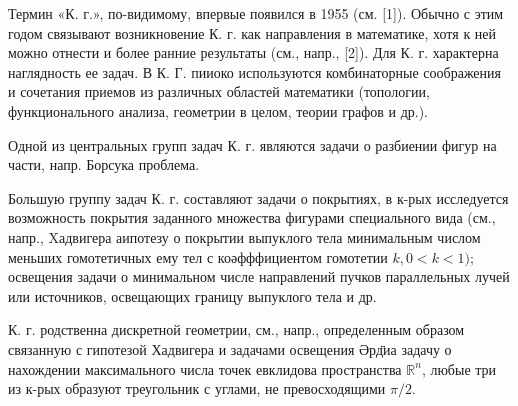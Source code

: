 \documentclass[10pt]{article}
\begin{document}
Термин «К. г.», по-видимому, впервые появился в 1955 (см. [1]). Обычно с этим годом связывают возникновение К. г. как направления в математике, хотя к ней можно отнести и более ранние результаты (см., напр., [2]). Для К. г. характерна наглядность ее задач. В К. Г. пииоко используются комбинаторные соображения и сочетания приемов из различных областей математики (топологии, функционального анализа, геометрии в целом, теории графов и др.).



Одной из центральных групп задач К. г. являются задачи о разбиении фигур на части, напр. Борсука проблема.



Большую группу задач К. г. составляют задачи о покрытиях, в к-рых исследуется возможность покрытия заданного множества фигурами специального вида (см., напр., Xадвигера аипотезу о покрытии выпуклого тела минимальным числом меньших гомотетичных ему тел с коәфффициентом гомотетии $k, 0<k<1)$; освещения задачи о минимальном числе направлений пучков параллельных лучей или источников, освещающих границу выпуклого тела и др.



К. г. родственна дискретной геометрии, см., напр., определенным образом связанную с гипотезой Хадвигера и задачами освещения Әрд̈̈иа задачу о нахождении максимального числа точек евклидова пространства $\mathbb{R}^{n}$, любые три из к-рых образуют треугольник с углами, не превосходящими $\pi / 2$.
\end{document}
